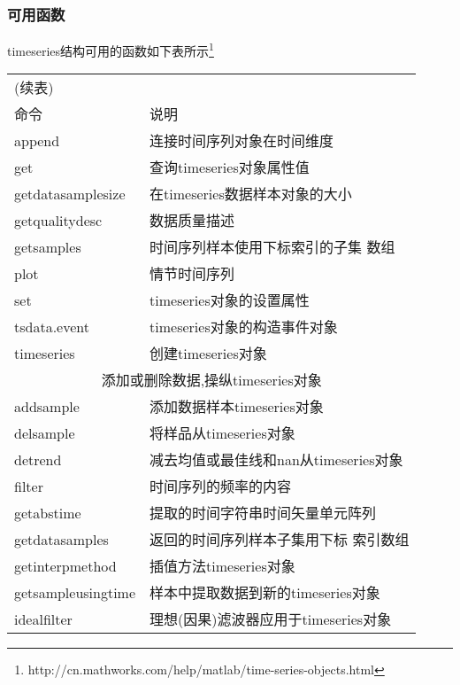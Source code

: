         \subsubsection{可用函数}
            \par
            timeseries结构可用的函数如下表所示\footnote{http://cn.mathworks.com/help/matlab/time-series-objects.html}
            \begin{longtable}{|l|l|}
            \hline
            \endfirsthead
            \multicolumn{2}{l}{(续表)}
            \endhead
            \hline
            \multicolumn{2}{c}{\itshape 接下页表格……}\\
            \endfoot
            \hline
            \endlastfoot
            \hline
            命令 & 说明 \\
            \hline
            append  &连接时间序列对象在时间维度\\
            get &  查询timeseries对象属性值\\
            getdatasamplesize  & 在timeseries数据样本对象的大小\\
            getqualitydesc & 数据质量描述\\
            getsamples & 时间序列样本使用下标索引的子集 数组\\
            plot & 情节时间序列\\
            set &  timeseries对象的设置属性\\
            tsdata.event & timeseries对象的构造事件对象\\
            timeseries & 创建timeseries对象\\
            \hline
            \multicolumn{2}{|c|}{添加或删除数据,操纵timeseries对象}\\
            \hline
            addsample &  添加数据样本timeseries对象\\
            delsample  & 将样品从timeseries对象\\
            detrend  & 减去均值或最佳线和nan从timeseries对象\\
            filter & 时间序列的频率的内容\\
            getabstime  &提取的时间字符串时间矢量单元阵列\\
            getdatasamples & 返回的时间序列样本子集用下标 索引数组\\
            getinterpmethod  & 插值方法timeseries对象\\
            getsampleusingtime  &样本中提取数据到新的timeseries对象\\
            idealfilter  & 理想(因果)滤波器应用于timeseries对象\\

\end{longtable}
